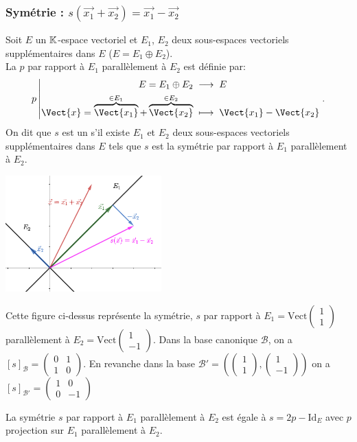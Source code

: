 \documentclass{book}
\begin{document}
\subsubsection{Symétrie : $s(\vec{x_1} + \vec{x_2})=\vec{x_1}-\vec{x_2}$}
\begin{Definition}[Projecteur]
 Soit $E$ un $\mathbb{K} $-espace vectoriel et $E_1$, $E_2$ deux sous-espaces vectoriels supplémentaires dans $E$  ($E = E_1 \oplus E_2$).\\
La  $p$ par rapport à $E_1$ parallèlement à $E_2$ est définie par:
$$\Fonction{p}{ E = E_1 \oplus E_2 }{ E}{\Vect{x} = \overbrace{\Vect{x_1}}^{\in E_1} + \overbrace{\Vect{x_2}}^{\in E_2}}{\Vect{x_1}-\Vect{x_2}}.$$
On dit que $s$ est un  s'il existe $E_1$ et $E_2$ deux sous-espaces vectoriels supplémentaires dans $E$ tels que
$s$ est la symétrie  par rapport à $E_1$ parallèlement à $E_2$.
\end{Definition}
\begin{Exemple}
\begin{center}
\includegraphics[width=6cm]{symetrie.png}
\end{center}
Cette figure ci-dessus représente la symétrie, $s$ par rapport à $E_1=\mathrm{Vect}\begin{pmatrix}
1\\1
\end{pmatrix}$ parallèlement à $E_2=\mathrm{Vect}\begin{pmatrix}1\\-1
\end{pmatrix}$.  Dans la base canonique $\mathcal{B}$, on a $[s]_\mathcal{B}=\begin{pmatrix}0&1\\1&0\end{pmatrix}$. En revanche dans la base  $\mathcal{B}'=\left(\begin{pmatrix}
1\\1
\end{pmatrix},\begin{pmatrix}1\\-1
\end{pmatrix}\right) $ on a $[s]_{\mathcal{B}'}=\begin{pmatrix}1&0\\0&-1\end{pmatrix}$
\end{Exemple}
\begin{Proposition} 
La symétrie $s$ par rapport à $E_1$ parallèlement à $E_2$ est égale à $s=2p-\mathrm{Id}_E$ avec $p$ projection sur $E_1$ parallèlement à $E_2$.
\end{Proposition}
\end{document}
